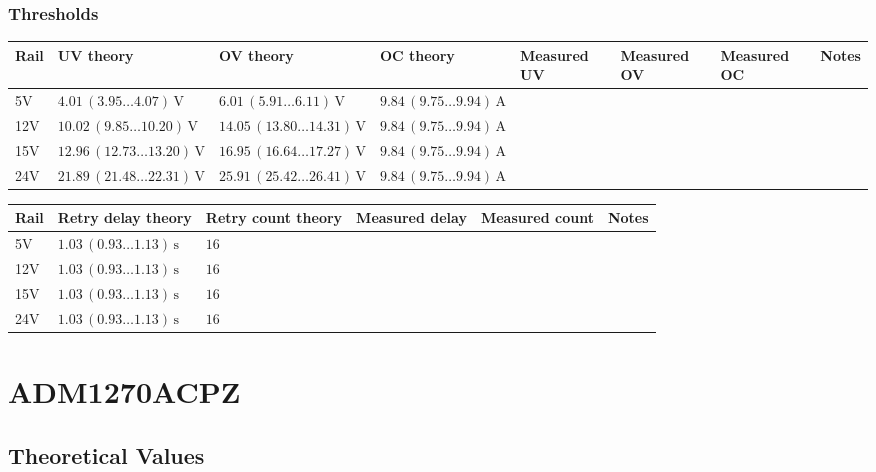 \documentclass[11pt,a4paper]{article}
\begin{document}
\subsubsection{Thresholds}
\small
\begin{tabularx}{\textwidth}{p{1.2cm}p{2.2cm}p{2.2cm}p{2.2cm}p{1.8cm}p{1.8cm}p{1.8cm}Y}
\toprule
Rail & UV theory & OV theory & OC theory & Measured UV & Measured OV & Measured OC & Notes \\
\midrule
5V  & $4.01\,(3.95\ldots4.07)\,\mathrm{V}$ & $6.01\,(5.91\ldots6.11)\,\mathrm{V}$ & $9.84\,(9.75\ldots9.94)\,\mathrm{A}$ & & & & \\
12V & $10.02\,(9.85\ldots10.20)\,\mathrm{V}$ & $14.05\,(13.80\ldots14.31)\,\mathrm{V}$ & $9.84\,(9.75\ldots9.94)\,\mathrm{A}$ & & & & \\
15V & $12.96\,(12.73\ldots13.20)\,\mathrm{V}$ & $16.95\,(16.64\ldots17.27)\,\mathrm{V}$ & $9.84\,(9.75\ldots9.94)\,\mathrm{A}$ & & & & \\
24V & $21.89\,(21.48\ldots22.31)\,\mathrm{V}$ & $25.91\,(25.42\ldots26.41)\,\mathrm{V}$ & $9.84\,(9.75\ldots9.94)\,\mathrm{A}$ & & & & \\
\bottomrule
\end{tabularx}
\normalsize

\vspace{0.8em}

\small
\begin{tabularx}{\textwidth}{p{1.2cm}p{2.6cm}p{2.2cm}p{2.2cm}p{2.0cm}Y}
\toprule
Rail & Retry delay theory & Retry count theory & Measured delay & Measured count & Notes \\
\midrule
5V  & $1.03\,(0.93\ldots1.13)\,\mathrm{s}$ & $16$ & & & \\
12V & $1.03\,(0.93\ldots1.13)\,\mathrm{s}$ & $16$ & & & \\
15V & $1.03\,(0.93\ldots1.13)\,\mathrm{s}$ & $16$ & & & \\
24V & $1.03\,(0.93\ldots1.13)\,\mathrm{s}$ & $16$ & & & \\
\bottomrule
\end{tabularx}
\normalsize

\section{ADM1270ACPZ}

\subsection{Theoretical Values}
\end{document}
